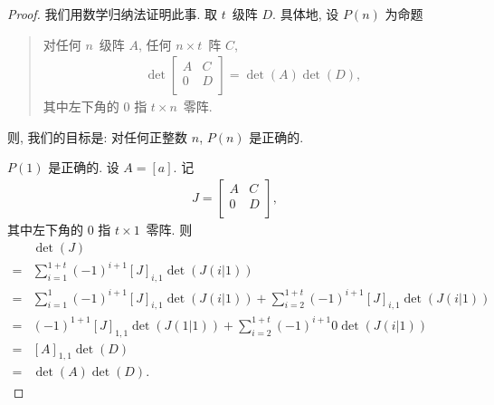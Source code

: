 \begin{proof}
    我们用数学归纳法证明此事.
    取 \(t\)~级阵 \(D\).
    具体地, 设 \(P(n)\) 为命题
    \begin{quotation}
        对任何 \(n\)~级阵 \(A\), 任何 \(n \times t\)~阵 \(C\),
        \begin{align*}
            \det {
                \begin{bmatrix}
                    A & C \\
                    0 & D \\
                \end{bmatrix}
            }
            = \det {(A)} \det {(D)},
        \end{align*}
        其中左下角的 \(0\) 指 \(t \times n\)~零阵.
    \end{quotation}
    则, 我们的目标是:
    对任何正整数 \(n\), \(P(n)\) 是正确的.

    \(P(1)\) 是正确的.
    设 \(A = [a]\).
    记
    \begin{align*}
        J =
        \begin{bmatrix}
            A & C \\
            0 & D \\
        \end{bmatrix},
    \end{align*}
    其中左下角的 \(0\) 指 \(t \times 1\)~零阵.
    则
    \begin{align*}
             & \det {(J)}
        \\
        = {} & \sum_{i = 1}^{1+t}
        {(-1)^{i+1} [J]_{i,1} \det {(J(i|1))}}
        \\
        = {} & \sum_{i = 1}^{1}
        {(-1)^{i+1} [J]_{i,1} \det {(J(i|1))}}
        +
        \sum_{i = 2}^{1+t}
        {(-1)^{i+1} [J]_{i,1} \det {(J(i|1))}}
        \\
        = {} &
        (-1)^{1+1} [J]_{1,1} \det {(J(1|1))}
        +
        \sum_{i = 2}^{1+t}
        {(-1)^{i+1} 0 \det {(J(i|1))}}
        \\
        = {} &
        [A]_{1,1} \det {(D)}
        \\
        = {} & \det {(A)} \det {(D)}.
    \end{align*}


\end{proof}
